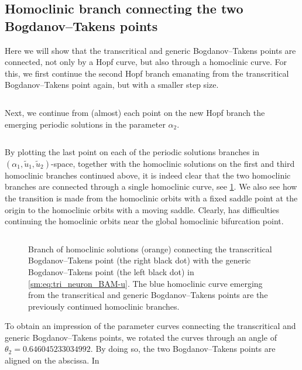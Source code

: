 \subsection{{\ifthesis \phantom{ } \fi} Homoclinic branch connecting the two Bogdanov--Takens {\ifthesis \phantom{ } \fi} points}
Here we will show that the transcritical and generic
Bogdanov--Takens points are connected, not only by a Hopf curve, but also
through a homoclinic curve. For this, we first continue the 
second Hopf branch emanating from the transcritical Bogdanov--Takens point again,
but with a smaller step size.
\inputminted[firstline=416, lastline=429]{MATLAB}{\pathToDDEBifToolDemos/BAM_neural_network_model/BAMnn.m}
%
Next, we continue from (almost) each point on the new Hopf branch the emerging periodic solutions in the parameter $\alpha_2$.
\inputminted[firstline=436, lastline=446]{MATLAB}{\pathToDDEBifToolDemos/BAM_neural_network_model/BAMnn.m}
%
By plotting the last point on each of the periodic solutions branches in
$(\alpha_1, \tilde u_1, \tilde u_2)$-space,
together with the homoclinic solutions on the first and third homoclinic branches continued
above, it is indeed clear that the two homoclinic branches are connected through a
single homoclinic curve, see
\cref{sm:fig:triNeuronBAMNeuralNetworkModelConnectionHomoclinicSolutions}.
We also see how the transition is made from the homoclinic orbits with a fixed saddle point
at the origin to the homoclinic orbits with a moving saddle. Clearly, \DDEBIFTOOL has
difficulties continuing the homoclinic orbits near the global homoclinic bifurcation point.
\inputminted[firstline=461, lastline=490]{MATLAB}{\pathToDDEBifToolDemos/BAM_neural_network_model/BAMnn.m}
%
\begin{figure}[ht]
    \caption{
        Branch of homoclinic solutions (orange) connecting the transcritical Bogdanov--Takens point (the right black dot) with
        the generic Bogdanov--Takens point (the left black dot) in
        \cref{sm:eq:tri_neuron_BAM-u}. The blue homoclinic curve emerging from 
        the transcritical and generic Bogdanov--Takens points are the previously continued
        homoclinic branches.
     }
    \label{sm:fig:triNeuronBAMNeuralNetworkModelConnectionHomoclinicSolutions}
\end{figure}
To obtain an impression of the parameter curves connecting the transcritical and
generic Bogdanov--Takens points, we rotated the  curves through an angle of $\theta_2=0.646045233034992$.
By doing so, the two Bogdanov--Takens points are aligned on the abscissa. In
